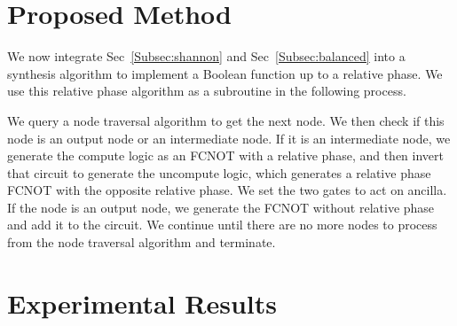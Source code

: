 \documentclass[a4paper]{article}
\begin{document}
{\section{Proposed Method}

We now integrate Sec~\ref{Subsec:shannon} and Sec~\ref{Subsec:balanced}
into a synthesis algorithm to implement a Boolean function up to a relative phase. We use this relative phase
algorithm as a subroutine in the following process.


We query a node traversal algorithm to get the next
node. We then check if this node is an output node or an intermediate node. If it is an
intermediate node, we generate the compute logic as an FCNOT with a relative phase,
and then invert that circuit to generate the uncompute logic, which generates a relative phase
FCNOT with the opposite relative phase. We set the two gates to act on ancilla. If the node is
an output node, we generate the FCNOT without relative phase and add it to the circuit. We continue
until there are no more nodes to process from the node traversal algorithm and terminate.

\section{Experimental Results}
\label{Subsec:Analysis}

}
\end{document}
